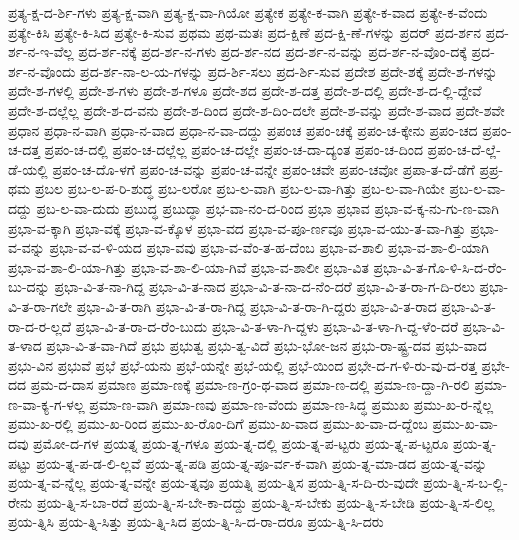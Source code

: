 {ಪ್ರತ್ಯ-ಕ್ಷ-ದ-ರ್ಶಿ-ಗಳು
ಪ್ರತ್ಯ-ಕ್ಷ-ವಾಗಿ
ಪ್ರತ್ಯ-ಕ್ಷ-ವಾ-ಗಿಯೋ
ಪ್ರತ್ಯೇಕ
ಪ್ರತ್ಯೇ-ಕ-ವಾಗಿ
ಪ್ರತ್ಯೇ-ಕ-ವಾದ
ಪ್ರತ್ಯೇ-ಕ-ವೆಂದು
ಪ್ರತ್ಯೇ-ಕಿಸಿ
ಪ್ರತ್ಯೇ-ಕಿ-ಸಿದ
ಪ್ರತ್ಯೇ-ಕಿ-ಸುವ
ಪ್ರಥಮ
ಪ್ರಥ-ಮತಃ
ಪ್ರದ-ಕ್ಷಿಣೆ
ಪ್ರದ-ಕ್ಷಿ-ಣೆ-ಗಳನ್ನು
ಪ್ರದರ್
ಪ್ರದ-ರ್ಶನ
ಪ್ರದ-ರ್ಶ-ನ-ಇ-ವೆಲ್ಲ
ಪ್ರದ-ರ್ಶ-ನಕ್ಕೆ
ಪ್ರದ-ರ್ಶ-ನ-ಗಳು
ಪ್ರದ-ರ್ಶ-ನದ
ಪ್ರದ-ರ್ಶ-ನ-ವನ್ನು
ಪ್ರದ-ರ್ಶ-ನ-ವೊಂ-ದಕ್ಕೆ
ಪ್ರದ-ರ್ಶ-ನ-ವೊಂದು
ಪ್ರದ-ರ್ಶ-ನಾ-ಲ-ಯ-ಗಳನ್ನು
ಪ್ರದ-ರ್ಶಿ-ಸಲು
ಪ್ರದ-ರ್ಶಿ-ಸುವ
ಪ್ರದೇಶ
ಪ್ರದೇ-ಶಕ್ಕೆ
ಪ್ರದೇ-ಶ-ಗಳನ್ನು
ಪ್ರದೇ-ಶ-ಗಳಲ್ಲಿ
ಪ್ರದೇ-ಶ-ಗಳು
ಪ್ರದೇ-ಶ-ಗಳೂ
ಪ್ರದೇ-ಶದ
ಪ್ರದೇ-ಶ-ದತ್ತ
ಪ್ರದೇ-ಶ-ದಲ್ಲಿ
ಪ್ರದೇ-ಶ-ದ-ಲ್ಲಿ-ದ್ದೇವೆ
ಪ್ರದೇ-ಶ-ದಲ್ಲೆಲ್ಲ
ಪ್ರದೇ-ಶ-ದ-ವನು
ಪ್ರದೇ-ಶ-ದಿಂದ
ಪ್ರದೇ-ಶ-ದಿಂ-ದಲೇ
ಪ್ರದೇ-ಶ-ವನ್ನು
ಪ್ರದೇ-ಶ-ವಾದ
ಪ್ರದೇ-ಶವೇ
ಪ್ರಧಾನ
ಪ್ರಧಾ-ನ-ವಾಗಿ
ಪ್ರಧಾ-ನ-ವಾದ
ಪ್ರಧಾ-ನ-ವಾ-ದದ್ದು
ಪ್ರಪಂಚ
ಪ್ರಪಂ-ಚಕ್ಕೆ
ಪ್ರಪಂ-ಚ-ಕ್ಕೇನು
ಪ್ರಪಂ-ಚದ
ಪ್ರಪಂ-ಚ-ದತ್ತ
ಪ್ರಪಂ-ಚ-ದಲ್ಲಿ
ಪ್ರಪಂ-ಚ-ದಲ್ಲೆಲ್ಲ
ಪ್ರಪಂ-ಚ-ದಲ್ಲೇ
ಪ್ರಪಂ-ಚ-ದಾ-ದ್ಯಂತ
ಪ್ರಪಂ-ಚ-ದಿಂದ
ಪ್ರಪಂ-ಚ-ದೆ-ಲ್ಲೆ-ಡೆ-ಯಲ್ಲಿ
ಪ್ರಪಂ-ಚ-ದೊ-ಳಗೆ
ಪ್ರಪಂ-ಚ-ವನ್ನು
ಪ್ರಪಂ-ಚ-ವನ್ನೇ
ಪ್ರಪಂ-ಚವೇ
ಪ್ರಪಂ-ಚವೋ
ಪ್ರಪಾ-ತ-ದೆ-ಡೆಗೆ
ಪ್ರಪ್ರ-ಥಮ
ಪ್ರಬಲ
ಪ್ರಬ-ಲ-ಪ-ರಿ-ಶುದ್ಧ
ಪ್ರಬ-ಲರೋ
ಪ್ರಬ-ಲ-ವಾಗಿ
ಪ್ರಬ-ಲ-ವಾ-ಗಿತ್ತು
ಪ್ರಬ-ಲ-ವಾ-ಗಿಯೇ
ಪ್ರಬ-ಲ-ವಾ-ದದ್ದು
ಪ್ರಬ-ಲ-ವಾ-ದುದು
ಪ್ರಬುದ್ಧ
ಪ್ರಬುದ್ಧಾ
ಪ್ರಭ-ವಾ-ನಂ-ದ-ರಿಂದ
ಪ್ರಭಾ
ಪ್ರಭಾವ
ಪ್ರಭಾ-ವ-ಕ್ಕ-ನು-ಗು-ಣ-ವಾಗಿ
ಪ್ರಭಾ-ವ-ಕ್ಕಾಗಿ
ಪ್ರಭಾ-ವಕ್ಕೆ
ಪ್ರಭಾ-ವ-ಕ್ಕೊಳ
ಪ್ರಭಾ-ವದ
ಪ್ರಭಾ-ವ-ಪೂ-ರ್ಣವೂ
ಪ್ರಭಾ-ವ-ಯು-ತ-ವಾ-ಗಿತ್ತು
ಪ್ರಭಾ-ವ-ವನ್ನು
ಪ್ರಭಾ-ವ-ವ-ಳಿ-ಯದ
ಪ್ರಭಾ-ವವು
ಪ್ರಭಾ-ವ-ವೆಂ-ತ-ಹ-ದೆಂಬ
ಪ್ರಭಾ-ವ-ಶಾಲಿ
ಪ್ರಭಾ-ವ-ಶಾ-ಲಿ-ಯಾಗಿ
ಪ್ರಭಾ-ವ-ಶಾ-ಲಿ-ಯಾ-ಗಿತ್ತು
ಪ್ರಭಾ-ವ-ಶಾ-ಲಿ-ಯಾ-ಗಿವೆ
ಪ್ರಭಾ-ವ-ಶಾಲೀ
ಪ್ರಭಾ-ವಿತ
ಪ್ರಭಾ-ವಿ-ತ-ಗೊ-ಳಿ-ಸಿ-ದ-ರೆಂ-ಬು-ದನ್ನು
ಪ್ರಭಾ-ವಿ-ತ-ನಾ-ಗಿದ್ದ
ಪ್ರಭಾ-ವಿ-ತ-ನಾದ
ಪ್ರಭಾ-ವಿ-ತ-ನಾ-ದ-ನೆಂ-ದರೆ
ಪ್ರಭಾ-ವಿ-ತ-ರಾ-ಗ-ದಿ-ರಲು
ಪ್ರಭಾ-ವಿ-ತ-ರಾ-ಗಲೇ
ಪ್ರಭಾ-ವಿ-ತ-ರಾಗಿ
ಪ್ರಭಾ-ವಿ-ತ-ರಾ-ಗಿದ್ದ
ಪ್ರಭಾ-ವಿ-ತ-ರಾ-ಗಿ-ದ್ದರು
ಪ್ರಭಾ-ವಿ-ತ-ರಾದ
ಪ್ರಭಾ-ವಿ-ತ-ರಾ-ದ-ರ-ಲ್ಲದೆ
ಪ್ರಭಾ-ವಿ-ತ-ರಾ-ದ-ರೆಂ-ಬುದು
ಪ್ರಭಾ-ವಿ-ತ-ಳಾ-ಗಿ-ದ್ದಳು
ಪ್ರಭಾ-ವಿ-ತ-ಳಾ-ಗಿ-ದ್ದ-ಳೆಂ-ದರೆ
ಪ್ರಭಾ-ವಿ-ತ-ಳಾದ
ಪ್ರಭಾ-ವಿ-ತ-ವಾ-ಗಿದೆ
ಪ್ರಭು
ಪ್ರಭುತ್ವ
ಪ್ರಭು-ತ್ವ-ವಿದೆ
ಪ್ರಭು-ಭೋ-ಜನ
ಪ್ರಭು-ರಾ-ಷ್ಟ್ರ-ದವ
ಪ್ರಭು-ವಾದ
ಪ್ರಭು-ವಿನ
ಪ್ರಭುವೆ
ಪ್ರಭೆ
ಪ್ರಭೆ-ಯನು
ಪ್ರಭೆ-ಯನ್ನೇ
ಪ್ರಭೆ-ಯಲ್ಲಿ
ಪ್ರಭೆ-ಯಿಂದ
ಪ್ರಭೇ-ದ-ಗ-ಳಿ-ರು-ವು-ದ-ರತ್ತ
ಪ್ರಭೇ-ದದ
ಪ್ರಮ-ದ-ದಾಸ
ಪ್ರಮಾಣ
ಪ್ರಮಾ-ಣಕ್ಕೆ
ಪ್ರಮಾ-ಣ-ಗ್ರಂ-ಥ-ವಾದ
ಪ್ರಮಾ-ಣ-ದಲ್ಲಿ
ಪ್ರಮಾ-ಣ-ದ್ದಾ-ಗಿ-ರಲಿ
ಪ್ರಮಾ-ಣ-ವಾ-ಕ್ಯ-ಗ-ಳಲ್ಲ
ಪ್ರಮಾ-ಣ-ವಾಗಿ
ಪ್ರಮಾ-ಣವು
ಪ್ರಮಾ-ಣ-ವೆಂದು
ಪ್ರಮಾ-ಣ-ಸಿದ್ಧ
ಪ್ರಮುಖ
ಪ್ರಮು-ಖ-ರ-ನ್ನೆಲ್ಲ
ಪ್ರಮು-ಖ-ರಲ್ಲಿ
ಪ್ರಮು-ಖ-ರಿಂದ
ಪ್ರಮು-ಖ-ರೊಂ-ದಿಗೆ
ಪ್ರಮು-ಖ-ವಾದ
ಪ್ರಮು-ಖ-ವಾ-ದ-ದ್ದೆಂಬ
ಪ್ರಮು-ಖ-ವಾ-ದವು
ಪ್ರಮೋ-ದ-ಗಳ
ಪ್ರಯತ್ನ
ಪ್ರಯ-ತ್ನ-ಗಳೂ
ಪ್ರಯ-ತ್ನ-ದಲ್ಲಿ
ಪ್ರಯ-ತ್ನ-ಪ-ಟ್ಟರು
ಪ್ರಯ-ತ್ನ-ಪ-ಟ್ಟರೂ
ಪ್ರಯ-ತ್ನ-ಪಟ್ಟು
ಪ್ರಯ-ತ್ನ-ಪ-ಡ-ಲಿ-ಲ್ಲವೆ
ಪ್ರಯ-ತ್ನ-ಪಡಿ
ಪ್ರಯ-ತ್ನ-ಪೂ-ರ್ವ-ಕ-ವಾಗಿ
ಪ್ರಯ-ತ್ನ-ಮಾ-ಡದ
ಪ್ರಯ-ತ್ನ-ವನ್ನು
ಪ್ರಯ-ತ್ನ-ವ-ನ್ನೆಲ್ಲ
ಪ್ರಯ-ತ್ನ-ವನ್ನೇ
ಪ್ರಯ-ತ್ನವೂ
ಪ್ರಯತ್ನಿ
ಪ್ರಯ-ತ್ನಿಸ
ಪ್ರಯ-ತ್ನಿ-ಸ-ದಿ-ರು-ವುದೇ
ಪ್ರಯ-ತ್ನಿ-ಸ-ಬ-ಲ್ಲಿ-ರೇನು
ಪ್ರಯ-ತ್ನಿ-ಸ-ಬಾ-ರದೆ
ಪ್ರಯ-ತ್ನಿ-ಸ-ಬೇ-ಕಾ-ದದ್ದು
ಪ್ರಯ-ತ್ನಿ-ಸ-ಬೇಕು
ಪ್ರಯ-ತ್ನಿ-ಸ-ಬೇಡಿ
ಪ್ರಯ-ತ್ನಿ-ಸ-ಲಿಲ್ಲ
ಪ್ರಯ-ತ್ನಿಸಿ
ಪ್ರಯ-ತ್ನಿ-ಸಿತ್ತು
ಪ್ರಯ-ತ್ನಿ-ಸಿದ
ಪ್ರಯ-ತ್ನಿ-ಸಿ-ದ-ರಾ-ದರೂ
ಪ್ರಯ-ತ್ನಿ-ಸಿ-ದರು
}
